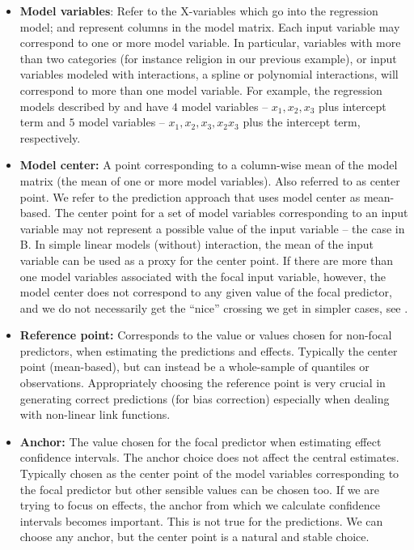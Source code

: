 \begin{itemize}
\item \textbf{Model variables}: Refer to the X-variables which go into the regression model; and represent columns in the model matrix. Each input variable may correspond to one or more model variable. In particular, variables with more than two categories (for instance religion in our previous example), or input variables modeled with interactions, a spline or polynomial interactions, will correspond to more than one model variable. For example, the regression models described by  and  have $4$ model variables -- $x_1, x_2, x_3$ plus intercept term and $5$ model variables -- $x_1, x_2, x_3, x_2x_3$ plus the intercept term, respectively.
\item \textbf{Model center:} A point corresponding to a column-wise mean of the model matrix (the mean of one or more model variables). Also referred to as center point. We refer to the prediction approach that uses model center as mean-based. The center point for a set of model variables corresponding to an input variable may not represent a possible value of the input variable -- the case in B. In simple linear models (without) interaction, the mean of the input variable can be used as a proxy for the center point. If there are more than one model variables associated with the focal input variable, however, the model center does not correspond to any given value of the focal predictor, and we do not necessarily get the ``nice'' crossing we get in simpler cases, see .
\item \textbf{Reference point:} Corresponds to the value or values chosen for non-focal predictors, when estimating the predictions and effects. Typically the center point (mean-based), but can instead be a whole-sample of quantiles or observations. Appropriately choosing the reference point is very crucial in generating correct predictions (for bias correction) especially when dealing with non-linear link functions.
\item \textbf{Anchor:} The value chosen for the focal predictor when estimating effect confidence intervals. The anchor choice does not affect the central estimates. Typically chosen as the center point of the model variables corresponding to the focal predictor but other sensible values can be chosen too. If we are trying to focus on effects, the anchor from which we calculate confidence intervals becomes important. This is not true for the predictions. We can choose any anchor, but the center point is a natural and stable choice.

\end{itemize}
